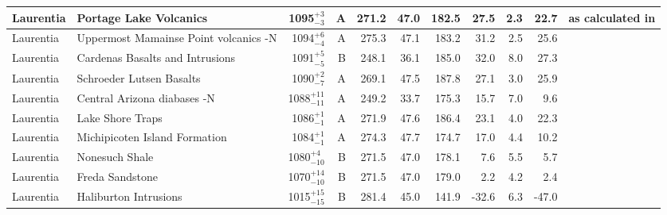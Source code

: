 \begin{ThreePartTable}
\begin{longtable}{p{1.4 in}p{1.2 in}rrrrrrrrp{1.2 in}}
                     Laurentia &                             Portage Lake Volcanics &     1095$^{+3}_{-3}$ &      A &     271.2 &      47.0 & 182.5 &  27.5 &       2.3 &        22.7 &  \cite{Books1972a, Hnat2006a} as calculated in \cite{Swanson-Hysell2019a} \\ \hline
                     Laurentia &              Uppermost Mamainse Point volcanics -N &     1094$^{+6}_{-4}$ &      A &     275.3 &      47.1 & 183.2 &  31.2 &       2.5 &        25.6 &                         \cite{Swanson-Hysell2014a} \\ \hline
                     Laurentia &                    Cardenas Basalts and Intrusions &     1091$^{+5}_{-5}$ &      B &     248.1 &      36.1 & 185.0 &  32.0 &       8.0 &        27.3 &                                   \cite{Weil2003a} \\ \hline
                     Laurentia &                           Schroeder Lutsen Basalts &     1090$^{+2}_{-7}$ &      A &     269.1 &      47.5 & 187.8 &  27.1 &       3.0 &        25.9 &                              \cite{Fairchild2017a} \\ \hline
                     Laurentia &                        Central Arizona diabases -N &   1088$^{+11}_{-11}$ &      A &     249.2 &      33.7 & 175.3 &  15.7 &       7.0 &         9.6 &                               \cite{Donadini2011b} \\ \hline
                     Laurentia &                                   Lake Shore Traps &     1086$^{+1}_{-1}$ &      A &     271.9 &      47.6 & 186.4 &  23.1 &       4.0 &        22.3 &                                \cite{Kulakov2013a} \\ \hline
                     Laurentia &                      Michipicoten Island Formation &     1084$^{+1}_{-1}$ &      A &     274.3 &      47.7 & 174.7 &  17.0 &       4.4 &        10.2 &                              \cite{Fairchild2017a} \\ \hline
                     Laurentia &                                     Nonesuch Shale &    1080$^{+4}_{-10}$ &      B &     271.5 &      47.0 & 178.1 &   7.6 &       5.5 &         5.7 &                                  \cite{Henry1977a} \\ \hline
                     Laurentia &                                    Freda Sandstone &   1070$^{+14}_{-10}$ &      B &     271.5 &      47.0 & 179.0 &   2.2 &       4.2 &         2.4 &                                  \cite{Henry1977a} \\ \hline
                     Laurentia &                              Haliburton Intrusions &   1015$^{+15}_{-15}$ &      B &     281.4 &      45.0 & 141.9 & -32.6 &       6.3 &       -47.0 &                                \cite{Warnock2000a} \\ \hline

\end{longtable}
\end{ThreePartTable}
